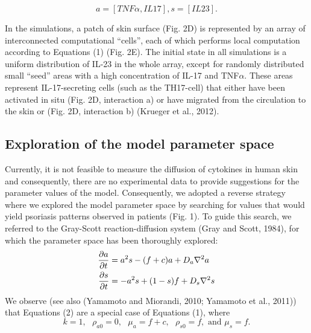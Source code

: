 \[a=[TNF\alpha, IL17], s=[IL23].\]

In the simulations, a patch of skin surface (Fig. 2D) is represented by an array of interconnected computational “cells”, each of which performs local computation according to Equations (1) (Fig. 2E). The initial state in all simulations is a uniform distribution of IL-23 in the whole array, except for randomly distributed small “seed” areas with a high concentration of IL-17 and TNF$\alpha$. These areas represent IL-17-secreting cells (such as the TH17-cell) that either have been activated in situ (Fig. 2D, interaction a) or have migrated from the circulation to the skin or (Fig. 2D, interaction b) (Krueger et al., 2012). 

\subsection{Exploration of the model parameter space}
Currently, it is not feasible to measure the diffusion of cytokines in human skin and consequently, there are no experimental data to provide suggestions for the parameter values of the model. Consequently, we adopted a reverse strategy where we explored the model parameter space by searching for values that would yield psoriasis patterns observed in patients (Fig. 1). To guide this search, we referred to the Gray-Scott reaction-diffusion system (Gray and Scott, 1984), for which the parameter space has been thoroughly explored:
\begin{equation}
	\begin{aligned} \label{eq:gsPsoriasis}
	\frac{\partial a}{\partial t} &= a^2s-(f+c)a+ D_a \nabla^2 a \\
	\frac{\partial s}{\partial t} &= -a^2s+(1-s)f + D_s \nabla^2 s
	\end{aligned}
\end{equation}
We observe (see also (Yamamoto and Miorandi, 2010; Yamamoto et al., 2011)) that Equations (2) are a special case of Equations (1), where
\[ k=1,\text{   }\rho_{a0}=0,\text{   }\mu_a=f+c,\text{   }\rho_{s0}=f,\text{ and }\mu_s=f.\]
